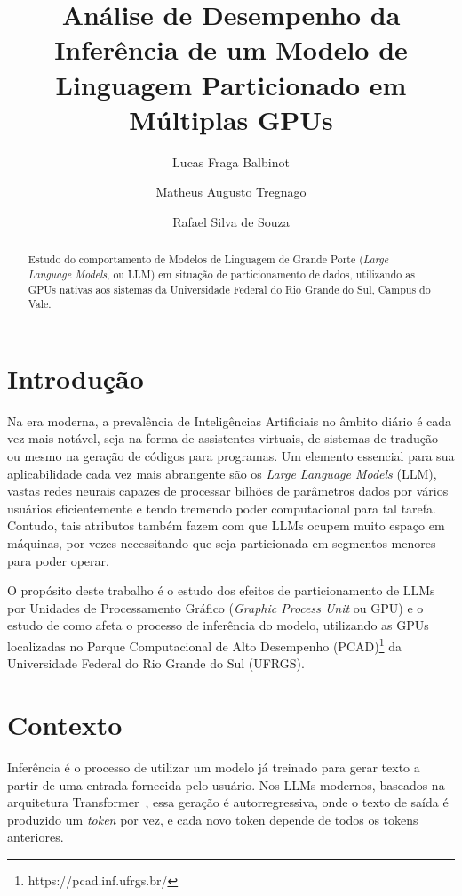 \documentclass[manuscript,screen]{acmart}
\title[Análise de Desempenho de Modelos de Linguagem]{Análise de Desempenho da Inferência de um Modelo de Linguagem Particionado em Múltiplas GPUs}
\author{Lucas Fraga Balbinot}
\author{Matheus Augusto Tregnago}
\author{Rafael Silva de Souza}
\affiliation{%
  \institution{Universidade Federal do Rio Grande do Sul}
  \city{Porto Alegre}
  \state{Rio Grande do Sul}
  \country{Brasil}
}
\begin{document}
\begin{abstract}
Estudo do comportamento de Modelos de Linguagem de Grande Porte (\textit{Large Language Models}, ou LLM) em situação de particionamento de dados, utilizando as GPUs nativas aos sistemas da Universidade Federal do Rio Grande do Sul, Campus do Vale.
\end{abstract}


\maketitle

\section{Introdução}
Na era moderna, a prevalência de Inteligências Artificiais no âmbito diário é cada vez mais notável, seja na forma de assistentes virtuais, de sistemas de tradução ou mesmo na geração de códigos para programas. Um elemento essencial para sua aplicabilidade cada vez mais abrangente são os \textit{Large Language Models} (LLM), vastas redes neurais capazes de processar bilhões de parâmetros dados por vários usuários eficientemente e tendo tremendo poder computacional para tal tarefa. Contudo, tais atributos também fazem com que LLMs ocupem muito espaço em máquinas, por vezes necessitando que seja particionada em segmentos menores para poder operar.

O propósito deste trabalho é o estudo dos efeitos de particionamento de LLMs por Unidades de Processamento Gráfico (\textit{Graphic Process Unit} ou GPU) e o estudo de como afeta o processo de inferência do modelo, utilizando as GPUs localizadas no Parque Computacional de Alto Desempenho (PCAD)\footnote{https://pcad.inf.ufrgs.br/} da Universidade Federal do Rio Grande do Sul (UFRGS).

\section{Contexto}

Inferência é o processo de utilizar um modelo já treinado para gerar texto a partir de uma entrada fornecida pelo usuário. Nos LLMs modernos, baseados na arquitetura Transformer~\cite{VASWANI2017}, essa geração é autorregressiva, onde o texto de saída é produzido um \textit{token} por vez, e cada novo token depende de todos os tokens anteriores.
\end{document}

